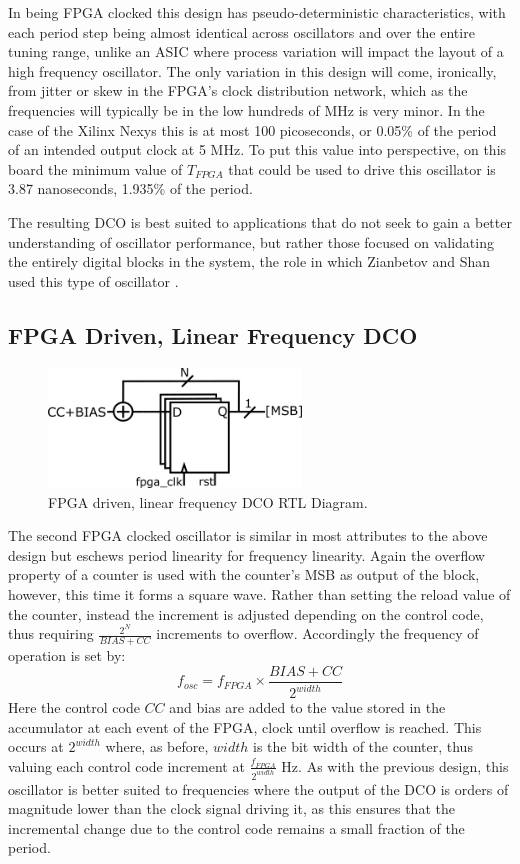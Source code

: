 In being \ac{FPGA} clocked this design has pseudo-deterministic characteristics, with each period step being almost identical across oscillators and over the entire tuning range, unlike an \ac{ASIC} where process variation will impact the layout of a high frequency oscillator. The only variation in this design will come, ironically, from jitter or skew in the \ac{FPGA}'s clock distribution network, which as the frequencies will typically be in the low hundreds of MHz is very minor. In the case of the Xilinx \acl{Nexys} this is at most 100 picoseconds, or 0.05\% of the period of an intended output clock at 5 MHz. To put this value into perspective, on this board the minimum value of $T_{FPGA}$ that could be used to drive this oscillator is 3.87 nanoseconds, 1.935\% of the period.

The resulting \ac{DCO} is best suited to applications that do not seek to gain a better understanding of oscillator performance, but rather those focused on validating the entirely digital blocks in the system, the role in which Zianbetov and Shan used this type of oscillator \cite{zianbetov2013phd,shan2014phd}.

\subsection{\acs{FPGA} Driven, Linear Frequency \acs{DCO}}
\begin{figure}[h]
	\centering
	\includegraphics[width=0.6\textwidth]{../osc2}
	\caption{\acs{FPGA} driven, linear frequency \acs{DCO} \ac{RTL} Diagram.}
	\label{fig:osc2}
\end{figure}
The second \ac{FPGA} clocked oscillator is similar in most attributes to the above design but eschews period linearity for frequency linearity. Again the overflow property of a counter is used with the counter's \ac{MSB} as output of the block, however, this time it forms a square wave. Rather than setting the reload value of the counter, instead the increment is adjusted depending on the control code, thus requiring $\frac{2^N}{BIAS+CC}$ increments to overflow. Accordingly the frequency of operation is set by:
\begin{equation}
	f_{osc} = f_{FPGA}\times\frac{BIAS+CC}{2^{width}}
\end{equation}
Here the control code $CC$ and bias are added to the value stored in the accumulator at each event of the \ac{FPGA}, clock until overflow is reached. This occurs at $2^{width}$ where, as before, $width$ is the bit width of the counter, thus valuing each control code increment at $\frac{f_{FPGA}}{2^{width}}$ Hz. As with the previous design, this oscillator is better suited to frequencies where the output of the \ac{DCO} is orders of magnitude lower than the clock signal driving it, as this ensures that the incremental change due to the control code remains a small fraction of the period.

